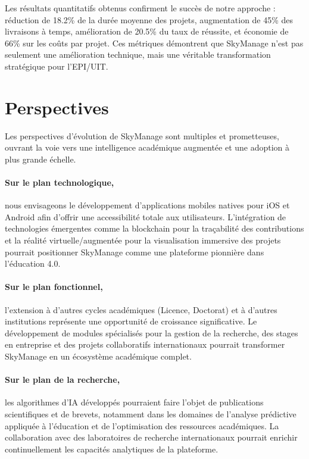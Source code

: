 Les résultats quantitatifs obtenus confirment le succès de notre approche : réduction de 18.2\% de la durée moyenne des projets, augmentation de 45\% des livraisons à temps, amélioration de 20.5\% du taux de réussite, et économie de 66\% sur les coûts par projet. Ces métriques démontrent que SkyManage n'est pas seulement une amélioration technique, mais une véritable transformation stratégique pour l'EPI/UIT.

\section*{Perspectives}

Les perspectives d'évolution de SkyManage sont multiples et prometteuses, ouvrant la voie vers une intelligence académique augmentée et une adoption à plus grande échelle.

\paragraph{Sur le plan technologique,} nous envisageons le développement d'applications mobiles natives pour iOS et Android afin d'offrir une accessibilité totale aux utilisateurs. L'intégration de technologies émergentes comme la blockchain pour la traçabilité des contributions et la réalité virtuelle/augmentée pour la visualisation immersive des projets pourrait positionner SkyManage comme une plateforme pionnière dans l'éducation 4.0.

\paragraph{Sur le plan fonctionnel,} l'extension à d'autres cycles académiques (Licence, Doctorat) et à d'autres institutions représente une opportunité de croissance significative. Le développement de modules spécialisés pour la gestion de la recherche, des stages en entreprise et des projets collaboratifs internationaux pourrait transformer SkyManage en un écosystème académique complet.

\paragraph{Sur le plan de la recherche,} les algorithmes d'IA développés pourraient faire l'objet de publications scientifiques et de brevets, notamment dans les domaines de l'analyse prédictive appliquée à l'éducation et de l'optimisation des ressources académiques. La collaboration avec des laboratoires de recherche internationaux pourrait enrichir continuellement les capacités analytiques de la plateforme.


